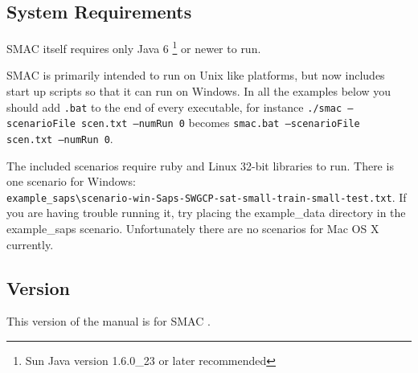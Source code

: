 \documentclass[manual.tex]{subfiles}
\begin{document}
\subsection{System Requirements}

SMAC itself requires only Java 6 \footnote{Sun Java version 1.6.0\_23 or later recommended} or newer to run. 

SMAC is primarily intended to run on Unix like platforms, but now includes start up scripts so that it can run on Windows. In all the examples below you should add \texttt{.bat} to the end of every executable, for instance \texttt{./smac --scenarioFile scen.txt --numRun 0} becomes \texttt{smac.bat --scenarioFile scen.txt --numRun 0}.

The included scenarios require ruby and Linux 32-bit libraries to run. There is one scenario for Windows:\\ \texttt{example\_saps\textbackslash scenario-win-Saps-SWGCP-sat-small-train-small-test.txt}. If you are having trouble running it, try placing the example\_data directory in the example\_saps scenario. Unfortunately there are no scenarios for Mac OS X currently.


\subsection{Version}
This version of the manual is for SMAC $\!\!$.
\\




\end{document}
